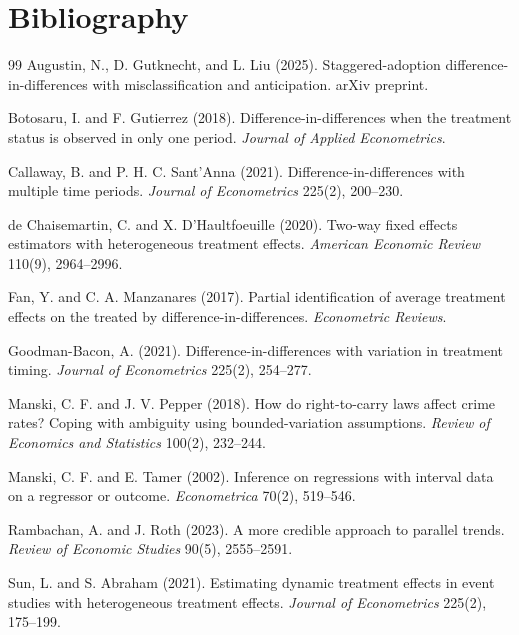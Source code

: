\documentclass[11pt]{article}
\theoremstyle{definition}
\theoremstyle{plain}
\theoremstyle{remark}
\begin{document}
\section*{Bibliography}
\begin{thebibliography}{99}
Augustin, N., D. Gutknecht, and L. Liu (2025).
Staggered-adoption difference-in-differences with misclassification and anticipation.
arXiv preprint.

Botosaru, I. and F. Gutierrez (2018).
Difference-in-differences when the treatment status is observed in only one period.
\emph{Journal of Applied Econometrics}.

Callaway, B. and P. H. C. Sant'Anna (2021).
Difference-in-differences with multiple time periods.
\emph{Journal of Econometrics} 225(2), 200--230.

de Chaisemartin, C. and X. D'Haultfoeuille (2020).
Two-way fixed effects estimators with heterogeneous treatment effects.
\emph{American Economic Review} 110(9), 2964--2996.

Fan, Y. and C. A. Manzanares (2017).
Partial identification of average treatment effects on the treated by difference-in-differences.
\emph{Econometric Reviews}.

Goodman-Bacon, A. (2021).
Difference-in-differences with variation in treatment timing.
\emph{Journal of Econometrics} 225(2), 254--277.

Manski, C. F. and J. V. Pepper (2018).
How do right-to-carry laws affect crime rates? Coping with ambiguity using bounded-variation assumptions.
\emph{Review of Economics and Statistics} 100(2), 232--244.

Manski, C. F. and E. Tamer (2002).
Inference on regressions with interval data on a regressor or outcome.
\emph{Econometrica} 70(2), 519--546.

Rambachan, A. and J. Roth (2023).
A more credible approach to parallel trends.
\emph{Review of Economic Studies} 90(5), 2555--2591.

Sun, L. and S. Abraham (2021).
Estimating dynamic treatment effects in event studies with heterogeneous treatment effects.
\emph{Journal of Econometrics} 225(2), 175--199.
\end{thebibliography}
\end{document}

